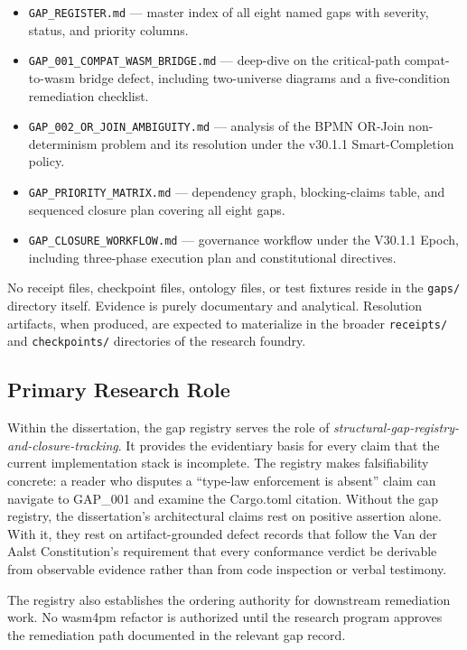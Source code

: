 \begin{itemize}
  \item \texttt{GAP\_REGISTER.md} — master index of all eight named gaps with severity,
        status, and priority columns.
  \item \texttt{GAP\_001\_COMPAT\_WASM\_BRIDGE.md} — deep-dive on the critical-path
        compat-to-wasm bridge defect, including two-universe diagrams and a five-condition
        remediation checklist.
  \item \texttt{GAP\_002\_OR\_JOIN\_AMBIGUITY.md} — analysis of the BPMN OR-Join
        non-determinism problem and its resolution under the v30.1.1 Smart-Completion
        policy.
  \item \texttt{GAP\_PRIORITY\_MATRIX.md} — dependency graph, blocking-claims table,
        and sequenced closure plan covering all eight gaps.
  \item \texttt{GAP\_CLOSURE\_WORKFLOW.md} — governance workflow under the V30.1.1 Epoch,
        including three-phase execution plan and constitutional directives.
\end{itemize}

No receipt files, checkpoint files, ontology files, or test fixtures reside in the
\texttt{gaps/} directory itself. Evidence is purely documentary and analytical.
Resolution artifacts, when produced, are expected to materialize in the broader
\texttt{receipts/} and \texttt{checkpoints/} directories of the research foundry.

\subsection{Primary Research Role}
\label{sec:gaps-identity-role}

Within the dissertation, the gap registry serves the role of \emph{structural-gap-registry-and-closure-tracking}.
It provides the evidentiary basis for every claim that the current implementation stack
is incomplete. The registry makes falsifiability concrete: a reader who disputes a
``type-law enforcement is absent'' claim can navigate to GAP\_001 and examine the Cargo.toml
citation. Without the gap registry, the dissertation's architectural claims rest on
positive assertion alone. With it, they rest on artifact-grounded defect records that
follow the Van der Aalst Constitution's requirement that every conformance verdict be
derivable from observable evidence rather than from code inspection or verbal testimony.

The registry also establishes the ordering authority for downstream remediation work.
No wasm4pm refactor is authorized until the research program approves the remediation
path documented in the relevant gap record.

